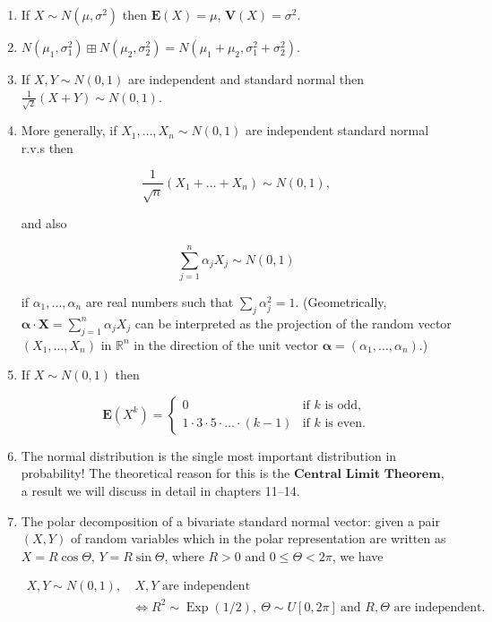 \documentclass[11pt]{report}
\newcommand{\R}{\mathbb{R}}
\theoremstyle{plain}
\theoremstyle{definition}
\begin{document}
\begin{enumerate}[label=\arabic*.]
\item If $X\sim N(\mu,\sigma^2)$ then $\mathbf{E}(X)=\mu$,
$\mathbf{V}(X) =\sigma^2$.

\item $N(\mu_1,\sigma_1^2) \boxplus N(\mu_2,\sigma_2^2) =
N(\mu_1+\mu_2,\sigma_1^2+\sigma_2^2)$.

\item If $X,Y\sim N(0,1)$ are independent and standard
normal then $\frac{1}{\sqrt{2}}(X+Y) \sim N(0,1)$.

\item More generally, if $X_1,\ldots,X_n \sim N(0,1)$ are
independent standard normal r.v.s then

\[
\frac{1}{\sqrt{n}}(X_1+\ldots+X_n) \sim N(0,1),
\]

and also

\[
\sum_{j=1}^n \alpha_j X_j \sim N(0,1)
\]

if $\alpha_1,\ldots,\alpha_n$ are real numbers such
that $\sum_j \alpha_j^2 = 1$. (Geometrically,
$\mathbf{\alpha}\cdot \mathbf{X} = \sum_{j=1}^n
\alpha_j X_j$
can be interpreted as the projection of the random
vector $(X_1,\ldots,X_n)$ in $\R^n$ in the direction
of the unit vector
$\mathbf{\alpha}=(\alpha_1,\ldots,\alpha_n)$.)

\item If $X\sim N(0,1)$ then

\[
\mathbf{E}(X^k) = \begin{cases}
0 & \textrm{if } k \textrm{ is odd}, \\
1\cdot 3 \cdot 5 \cdot \ldots \cdot (k-1) & \textrm{if } k \textrm{ is even}.
\end{cases}
\]

\item The normal distribution is the single most important
distribution in probability! The theoretical reason
for this is the $\textbf{Central Limit Theorem}$, a
result we will discuss in detail in chapters 11--14.

\item The polar decomposition of a bivariate standard
normal vector: given a pair $(X,Y)$ of random
variables which in the polar representation are
written as $X=R\cos\Theta$, $Y=R\sin \Theta$, where
$R>0$ and $0\le \Theta<2\pi$, we have

\begin{align*}
X,Y\sim N(0,1), & \ X,Y\textrm{ are independent } \\
& \iff R^2 \sim \operatorname{Exp}(1/2), \ \Theta\sim U[0,2\pi]\ \textrm{and } R,\Theta \textrm{ are independent.}
\end{align*}
\end{enumerate}
\end{document}
